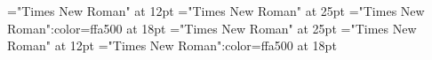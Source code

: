 \documentclass[a4paper]{article}
\begin{document}
 
\pagestyle{plain} 
\sloppy 
\setlength{\parfillskip}{0pt plus 1fil} 
\font\div="Times New Roman" at 12pt
\font{}="Times New Roman" at 25pt
\font{}="Times New Roman":color=ffa500 at 18pt
\font\entryletHeaddiv="Times New Roman" at 25pt
\font{}="Times New Roman" at 12pt
\font{}="Times New Roman":color=ffa500 at 18pt

\pagestyle{fancy} 


\end{document}
